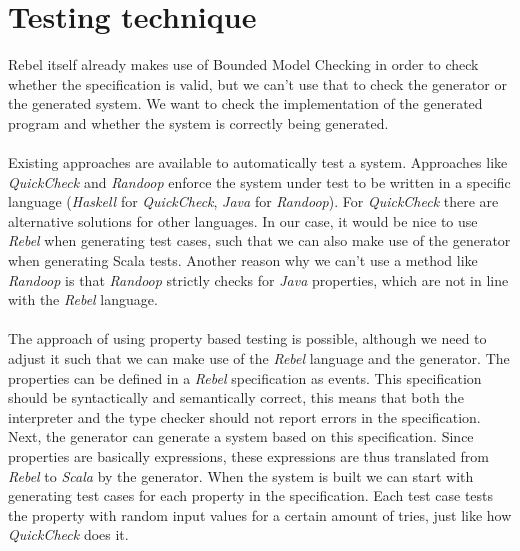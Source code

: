 \section{Testing technique}
Rebel itself already makes use of Bounded Model Checking in order to check whether the specification is valid, but we can't use that to check the generator or the generated system. We want to check the implementation of the generated program and whether the system is correctly being generated.\\
\\
Existing approaches are available to automatically test a system. Approaches like \textit{QuickCheck} \cite{claessen2011quickcheck} and \textit{Randoop} \cite{pacheco2007randoop} enforce the system under test to be written in a specific language (\textit{Haskell} for \textit{QuickCheck}, \textit{Java} for \textit{Randoop}). For \textit{QuickCheck} there are alternative solutions for other languages. In our case, it would be nice to use \textit{Rebel} when generating test cases, such that we can also make use of the generator when generating Scala tests. Another reason why we can't use a method like \textit{Randoop} is that \textit{Randoop} strictly checks for \textit{Java} properties, which are not in line with the \textit{Rebel} language.\\
\\
The approach of using property based testing is possible, although we need to adjust it such that we can make use of the \textit{Rebel} language and the generator. The properties can be defined in a \textit{Rebel} specification as events. This specification should be syntactically and semantically correct, this means that both the interpreter and the type checker should not report errors in the specification. Next, the generator can generate a system based on this specification. Since properties are basically expressions, these expressions are thus translated from \textit{Rebel} to \textit{Scala} by the generator. When the system is built we can start with generating test cases for each property in the specification. Each test case tests the property with random input values for a certain amount of tries, just like how \textit{QuickCheck} does it.\\
\\

